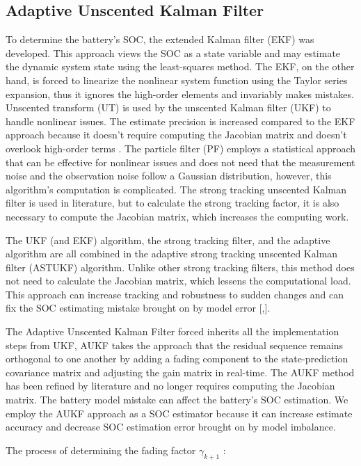 \subsection{Adaptive Unscented Kalman Filter}
To determine the battery's SOC, the extended Kalman filter (EKF) was developed. This approach views the SOC as a state variable and may estimate the dynamic system state using the least-squares method. The EKF, on the other hand, is forced to linearize the nonlinear system function using the Taylor series expansion, thus it ignores the high-order elements and invariably makes mistakes. Unscented transform (UT) is used by the unscented Kalman filter (UKF) to handle nonlinear issues. The estimate precision is increased compared to the EKF approach because it doesn't require computing the Jacobian matrix and doesn't overlook high-order terms \cite{Adaptive_UKF_for_SOC_Estimation}.
The particle filter (PF) employs a statistical approach that can be effective for nonlinear issues and does not need that the measurement noise and the observation noise follow a Gaussian distribution, however, this algorithm's computation is complicated.
The strong tracking unscented Kalman filter is used in literature, but to calculate the strong tracking factor, it is also necessary to compute the Jacobian matrix, which increases the computing work.

The UKF (and EKF) algorithm, the strong tracking filter, and the adaptive algorithm are all combined in the adaptive strong tracking unscented Kalman filter (ASTUKF) algorithm. Unlike other strong tracking filters, this method does not need to calculate the Jacobian matrix, which lessens the computational load. This approach can increase tracking and robustness to sudden changes and can fix the SOC estimating mistake brought on by model error [\cite{LIPO_AUKF_Meng},\cite{Comparision_EKF_UKF_He}].

The Adaptive Unscented Kalman Filter forced inherits all the implementation steps from UKF, AUKF takes the approach that the residual sequence remains orthogonal to one another by adding a fading component to the state-prediction covariance matrix and adjusting the gain matrix in real-time. The AUKF method has been refined by literature and no longer requires computing the Jacobian matrix. The battery model mistake can affect the battery's SOC estimation. We employ the AUKF approach as a SOC estimator because it can increase estimate accuracy and decrease SOC estimation error brought on by model imbalance.

The process of determining the fading factor $\gamma _{k+1}$ :\\


